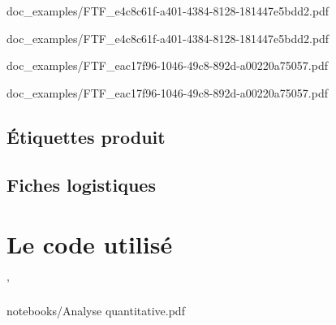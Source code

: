\documentclass{report}
\begin{document}
        
                    {doc_examples/FTF_e4c8c61f-a401-4384-8128-181447e5bdd2.pdf}
        
                    {doc_examples/FTF_e4c8c61f-a401-4384-8128-181447e5bdd2.pdf}


        
                    {doc_examples/FTF_eac17f96-1046-49c8-892d-a00220a75057.pdf}
        
                    {doc_examples/FTF_eac17f96-1046-49c8-892d-a00220a75057.pdf}
            
        \section{\'{E}tiquettes produit}
        \section{Fiches logistiques}
    \chapter{Le code utilisé}

'
        
                    {notebooks/Analyse quantitative.pdf}
\end{document}
